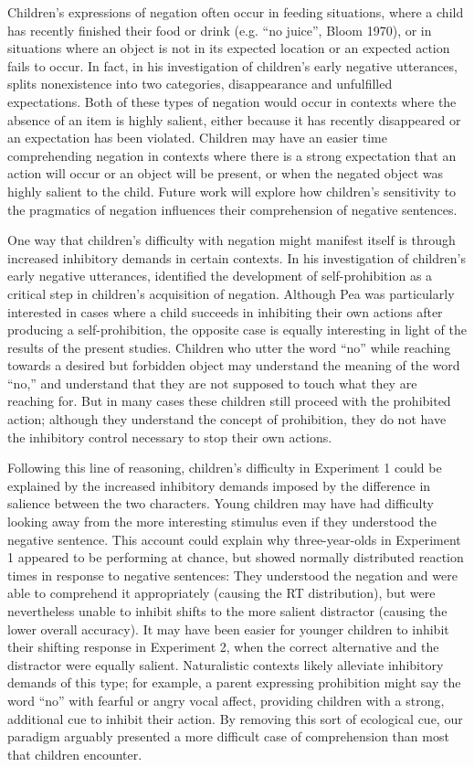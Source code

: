 \documentclass[man]{apa2}
\begin{document}
Children's expressions of negation often occur in feeding situations, where a child has recently finished their food or drink (e.g. ``no juice'', Bloom 1970), or in situations where an object is not in its expected location or an expected action fails to occur.  In fact, in his investigation of children's early negative utterances,  splits nonexistence into two categories, disappearance and unfulfilled expectations.  Both of these types of negation would occur in contexts where the absence of an item is highly salient, either because it has recently disappeared or an expectation has been violated.  Children may have an easier time comprehending negation in contexts where there is a strong expectation that an action will occur or an object will be present, or when the negated object was highly salient to the child.  Future work will explore how children's sensitivity to the pragmatics of negation influences their comprehension of negative sentences.

One way that children's difficulty with negation might manifest itself is through increased inhibitory demands in certain contexts.  In his investigation of children's early negative utterances,  identified the development of self-prohibition as a critical step in children's acquisition of negation.  Although Pea was particularly interested in cases where a child succeeds in inhibiting their own actions after producing a self-prohibition, the opposite case is equally interesting in light of the results of the present studies.  Children who utter the word ``no'' while reaching towards a desired but forbidden object may understand the meaning of the word ``no,'' and understand that they are not supposed to touch what they are reaching for.  But in many cases these children still proceed with the prohibited action; although they understand the concept of prohibition, they do not have the inhibitory control necessary to stop their own actions. 

Following this line of reasoning, children's difficulty in Experiment 1 could be explained by the increased inhibitory demands imposed by the difference in salience between the two characters. Young children may have had difficulty looking away from the more interesting stimulus even if they understood the negative sentence. This account could explain why three-year-olds in Experiment 1 appeared to be performing at chance, but showed normally distributed reaction times in response to negative sentences: They understood the negation and were able to comprehend it appropriately (causing the RT distribution), but were nevertheless unable to inhibit shifts to the more salient distractor (causing the lower overall accuracy). It may have been easier for younger children to inhibit their shifting response in Experiment 2, when the correct alternative and the distractor were equally salient.  Naturalistic contexts likely alleviate inhibitory demands of this type; for example, a parent expressing prohibition might say the word ``no'' with fearful or angry vocal affect, providing children with a strong, additional cue to inhibit their action. By removing this sort of ecological cue, our paradigm arguably presented a more difficult case of comprehension than most that children encounter.
\end{document}
